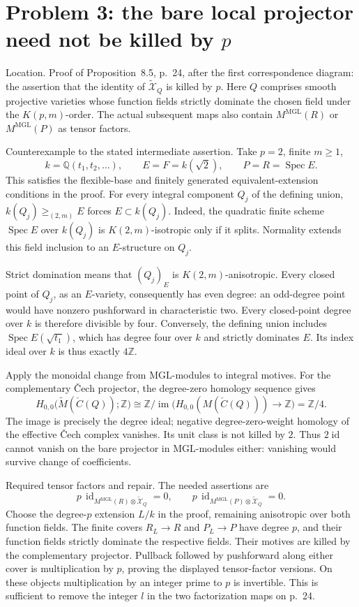 \documentclass[10pt]{article}
\begin{document}
\section*{Problem 3: the bare local projector need not be killed by \(p\)}
Location. Proof of Proposition 8.5, p. 24, after the first correspondence diagram: the assertion that the identity of \(\widetilde{\mathcal X}_{Q}\) is killed by \(p\). Here \(Q\) comprises smooth projective varieties whose function fields strictly dominate the chosen field under the \(K(p,m)\)-order. The actual subsequent maps also contain \(M^{\mathrm{MGL}}(R)\) or \(M^{\mathrm{MGL}}(P)\) as tensor factors.\par
Counterexample to the stated intermediate assertion. Take \(p=2\), finite \(m\ge1\), \[k=\mathbb Q(t_1,t_2,\ldots),\qquad E=F=k(\sqrt2),\qquad
 P=R=\operatorname{Spec}E .\] This satisfies the flexible-base and finitely generated equivalent-extension conditions in the proof. For every integral component \(Q_j\) of the defining union, \(k(Q_j)\ge_{(2,m)}E\) forces \(E\subset k(Q_j)\). Indeed, the quadratic finite scheme \(\operatorname{Spec}E\) over \(k(Q_j)\) is \(K(2,m)\)-isotropic only if it splits. Normality extends this field inclusion to an \(E\)-structure on \(Q_j\).\par
Strict domination means that \((Q_j)_E\) is \(K(2,m)\)-anisotropic. Every closed point of \(Q_j\), as an \(E\)-variety, consequently has even degree: an odd-degree point would have nonzero pushforward in characteristic two. Every closed-point degree over \(k\) is therefore divisible by four. Conversely, the defining union includes \(\operatorname{Spec}E(\sqrt{t_1})\), which has degree four over \(k\) and strictly dominates \(E\). Its index ideal over \(k\) is thus exactly \(4\mathbb Z\).\par
Apply the monoidal change from \(\mathrm{MGL}\)-modules to integral motives. For the complementary Čech projector, the degree-zero homology sequence gives \[H_{0,0}\bigl(\widetilde M(\check C(Q));\mathbb Z\bigr)
 \cong \mathbb Z/\operatorname{im}\bigl(H_{0,0}(M(\check C(Q)))\to\mathbb Z\bigr)
 =\mathbb Z/4 .\] The image is precisely the degree ideal; negative degree-zero-weight homology of the effective Čech complex vanishes. Its unit class is not killed by \(2\). Thus \(2\operatorname{id}\) cannot vanish on the bare projector in \(\mathrm{MGL}\)-modules either: vanishing would survive change of coefficients.\par
Required tensor factors and repair. The needed assertions are \[p\,\operatorname{id}_{M^{\mathrm{MGL}}(R)\otimes\widetilde{\mathcal X}_Q}=0,
 \qquad
 p\,\operatorname{id}_{M^{\mathrm{MGL}}(P)\otimes\widetilde{\mathcal X}_Q}=0 .\] Choose the degree-\(p\) extension \(L/k\) in the proof, remaining anisotropic over both function fields. The finite covers \(R_L\to R\) and \(P_L\to P\) have degree \(p\), and their function fields strictly dominate the respective fields. Their motives are killed by the complementary projector. Pullback followed by pushforward along either cover is multiplication by \(p\), proving the displayed tensor-factor versions. On these objects multiplication by an integer prime to \(p\) is invertible. This is sufficient to remove the integer \(l\) in the two factorization maps on p. 24.\par
\end{document}
